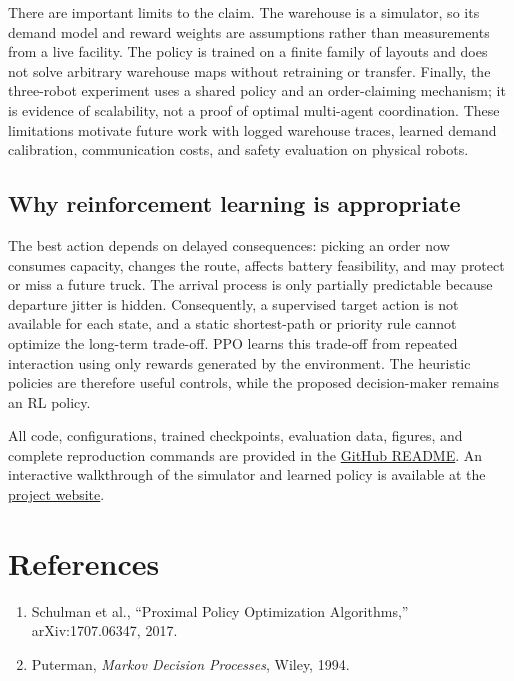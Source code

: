\documentclass[9pt,twocolumn]{article}
\begin{document}
There are important limits to the claim. The warehouse is a simulator, so its demand
model and reward weights are assumptions rather than measurements from a live facility.
The policy is trained on a finite family of layouts and does not solve arbitrary warehouse
maps without retraining or transfer. Finally, the three-robot experiment uses a shared
policy and an order-claiming mechanism; it is evidence of scalability, not a proof of
optimal multi-agent coordination. These limitations motivate future work with logged
warehouse traces, learned demand calibration, communication costs, and safety evaluation
on physical robots.

\subsection{Why reinforcement learning is appropriate}
The best action depends on delayed consequences: picking an order now consumes capacity,
changes the route, affects battery feasibility, and may protect or miss a future truck.
The arrival process is only partially predictable because departure jitter is hidden.
Consequently, a supervised target action is not available for each state, and a static
shortest-path or priority rule cannot optimize the long-term trade-off. PPO learns this
trade-off from repeated interaction using only rewards generated by the environment.
The heuristic policies are therefore useful controls, while the proposed decision-maker
remains an RL policy.

All code, configurations, trained checkpoints, evaluation data, figures, and complete
reproduction commands are provided in the
\href{https://github.com/Mohi1038/rl-warehouse-fulfillment/blob/main/README.md}{GitHub README}.
An interactive walkthrough of the simulator and learned policy is available at the
\href{https://mohi1038.github.io/rl-warehouse-fulfillment/}{project website}.

\section*{References}
\small
\begin{enumerate}\setlength{\itemsep}{0pt}\setlength{\parsep}{0pt}
\item Schulman et al., ``Proximal Policy Optimization Algorithms,'' arXiv:1707.06347, 2017.
\item Puterman, \emph{Markov Decision Processes}, Wiley, 1994.
\end{enumerate}
\end{document}
